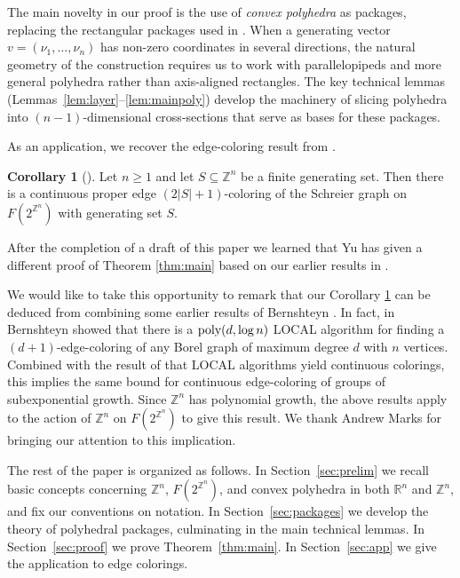 \documentclass{amsart}
\theoremstyle{definition}
\newtheorem{corollary}[theorem]{Corollary}
\newcommand{\Z}{\mathbb Z}
\newcommand{\R}{\mathbb R}
\begin{document}
The main novelty in our proof is the use of {\em convex polyhedra} as
packages, replacing the rectangular packages used in \cite{GW25}. When a
generating vector $v=(\nu_1,\dots,\nu_n)$ has non-zero coordinates in several
directions, the natural geometry of the construction requires us to work with
parallelopipeds and more general polyhedra rather than axis-aligned rectangles.
The key technical lemmas (Lemmas~\ref{lem:layer}--\ref{lem:mainpoly}) develop
the machinery of slicing polyhedra into $(n-1)$-dimensional cross-sections
that serve as bases for these packages.

As an application, we recover the edge-coloring result
from \cite{GWW25}.

\begin{corollary}[{\cite[Theorem 1.1]{GWW25}}]\label{cor:coloring}
Let $n\geq 1$ and let $S\subseteq \mathbb{Z}^n$ be a finite generating set.
Then there is a continuous proper edge $(2|S|+1)$-coloring of the Schreier
graph on $F(2^{\mathbb{Z}^n})$ with generating set $S$.
\end{corollary}

After the completion of a draft of this paper we learned that Yu \cite{Y26} has given a different proof of Theorem \ref{thm:main} based on our earlier results in \cite{GW25}.

We would like to take this opportunity to remark that our Corollary \ref{cor:coloring} can be deduced from combining some earlier results of Bernshteyn \cite{B22,B23}. In fact, in \cite{B22} Bernshteyn showed that there is a $\mbox{\rm poly}(d, \log n)$ LOCAL algorithm for finding a $(d+1)$-edge-coloring of any Borel graph of maximum degree $d$ with $n$ vertices. Combined with the result of \cite{B23} that LOCAL algorithms yield continuous colorings, this implies the same bound for continuous edge-coloring of groups of subexponential growth. Since $\mathbb{Z}^n$ has polynomial growth, the above results apply to the action of $\mathbb{Z}^n$ on $F(2^{\mathbb{Z}^n})$ to give this result. We thank Andrew Marks for bringing our attention to this implication. 

The rest of the paper is organized as follows. In Section~\ref{sec:prelim}
we recall basic concepts concerning $\mathbb{Z}^n$, $F(2^{\mathbb{Z}^n})$,
and convex polyhedra in both $\R^n$ and $\Z^n$, and fix our conventions on notation. In
Section~\ref{sec:packages} we develop the theory of polyhedral packages,
culminating in the main technical lemmas. In Section~\ref{sec:proof}
we prove Theorem~\ref{thm:main}. In Section~\ref{sec:app} we give the
application to edge colorings.
\end{document}
